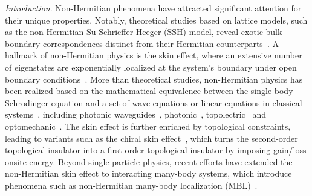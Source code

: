 \documentclass[longbibliography, aps, prx, amsmath, amssymb, amsfonts, twocolumn,superscriptaddress, footinbib]{revtex4-1}
\begin{document}
	\textit{Introduction}. Non-Hermitian phenomena have attracted significant attention for their unique properties. Notably, theoretical studies based on lattice models, such as the non-Hermitian Su-Schrieffer-Heeger (SSH) model, reveal exotic bulk-boundary correspondences distinct from their Hermitian counterparts~\cite{RN1166,RN1168}. 
	A hallmark of non-Hermitian physics is the skin effect, where an extensive number of eigenstates are exponentially localized at the system's boundary under open boundary conditions~\cite{gong2018topological,kawabata2019symmetry,RN1212,RN1214,RN1217,RN1160}. 
	More than theoretical studies, non-Hermitian physics has been realized based on the mathematical equivalence between the single-body Schr$\ddot{\mathrm{o}}$dinger equation and a set of wave equations or linear equations in classical systems~\cite{RN1161}, including photonic waveguides~\cite{nie2023non}, photonic~\cite{RN1165,RN1167,RN1227}, topolectric~\cite{zou2021observation,RN2,RN1225} and optomechanic~\cite{RN632,RN1226}. 
	The skin effect is further enriched by topological constraints, leading to variants such as the chiral skin effect~\cite{nakamura2023universal, ma2024non,schindler2023hermitian,lee2019hybrid,RN1221}, which turns the second-order topological insulator into a first-order topological insulator by imposing gain/loss onsite energy. 
	Beyond single-particle physics, recent efforts have extended the non-Hermitian skin effect to interacting many-body systems,
	which introduce phenomena such as non-Hermitian many-body localization (MBL)~\cite{mak2024statics,hamazaki2019non}. 
\end{document}

